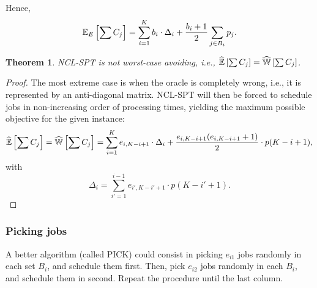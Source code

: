 \documentclass{article}
\newtheorem{theorem}{Theorem}
\begin{document}
Hence,
\[
    \mathbb{E}_E\left[\sum C_j\right]=\sum_{i=1}^{K} b_i \cdot \Delta_i + \frac{b_i+1}{2} \sum_{j\in B_i} p_j.
\]

\begin{theorem}
    NCL-SPT is \emph{not} worst-case avoiding, i.e., \(\widehat{\mathbb{E}}\left[\sum C_j\right]=\widehat{\mathbb{W}}\left[\sum C_j\right]\).
\end{theorem}
\begin{proof}
    The most extreme case is when the oracle is completely wrong, i.e., it is represented by an anti-diagonal matrix.
    NCL-SPT will then be forced to schedule jobs in non-increasing order of processing times, yielding the maximum possible objective for the given instance:
    \[
        \widehat{\mathbb{E}}\left[\sum C_j\right]=\widehat{\mathbb{W}}\left[\sum C_j\right]=\sum_{i=1}^K e_{i,K-i+1}\cdot\Delta_{i}+\frac{e_{i,K-i+1}(e_{i,K-i+1}+1)}{2}\cdot p(K-i+1),
    \]
    with
    \[
        \Delta_{i}=\sum_{i'=1}^{i-1} e_{i',K-i'+1}\cdot p(K-i'+1).
    \]

\end{proof}


\subsubsection{Picking jobs}

A better algorithm (called PICK) could consist in picking \(e_{i1}\) jobs randomly in each set \(B_i\), and schedule them first.
Then, pick \(e_{i2}\) jobs randomly in each \(B_i\), and schedule them in second. Repeat the procedure until the last column.


\end{document}
